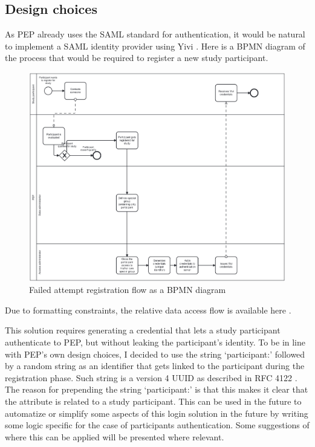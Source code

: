 \documentclass{report}
\begin{document}
\subsection{Design choices}\label{failed_attempt_design}
As PEP already uses the SAML standard \cite{sstc-saml-core-errata-2.0-wd-07} for authentication, it would be natural to implement a SAML identity provider using Yivi \cite{irma-app}.
Here is a BPMN diagram of the process that would be required to register a new study participant.

\begin{figure}[H]
	\includegraphics[scale=0.1]{registration_flow.png}
	\caption{Failed attempt registration flow as a BPMN diagram}
	\label{bpmn-registration-flow}
\end{figure}

Due to formatting constraints, the relative data access flow is available here \cite{data-access-failed-attempt-bpmn-diagram}.

This solution requires generating a credential that lets a study participant authenticate to PEP, but without leaking the participant's identity. To be in line with PEP's own
design choices, I decided to use the string \enquote*{participant:} followed by a random string as an identifier that gets linked to the participant during the registration phase. Such string is 
a version 4 UUID as described in RFC 4122 \cite{uuid_rfc}. The reason for prepending the string \enquote*{participant:} is that this makes it clear that the attribute is related to
a study participant. This can be used in the future to automatize or simplify some aspects of this login solution in the future by writing some logic specific for the case of
participants authentication. Some suggestions of where this can be applied will be presented where relevant.
\end{document}
